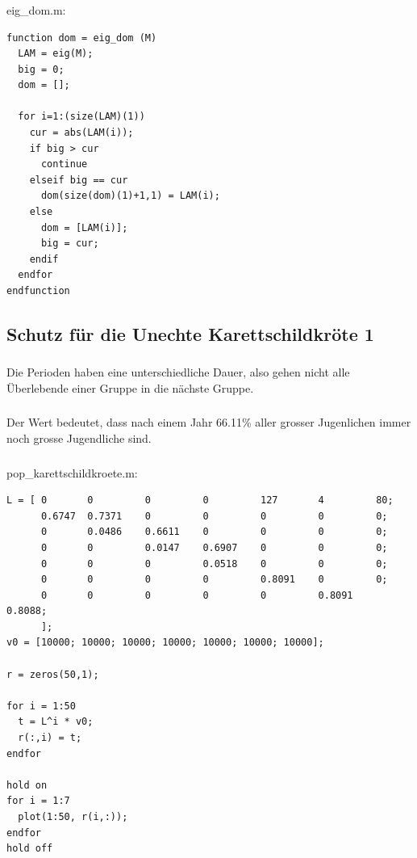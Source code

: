 \documentclass{article}
\begin{document}
\subsubsection{}

eig\_dom.m:
\begin{lstlisting}
function dom = eig_dom (M)
  LAM = eig(M);
  big = 0;
  dom = [];
  
  for i=1:(size(LAM)(1))
    cur = abs(LAM(i));
    if big > cur
      continue
    elseif big == cur
      dom(size(dom)(1)+1,1) = LAM(i);
    else
      dom = [LAM(i)];
      big = cur;
    endif
  endfor
endfunction
\end{lstlisting}

\subsection{Schutz für die Unechte Karettschildkröte 1}
\subsubsection{}
Die Perioden haben eine unterschiedliche Dauer, also gehen nicht alle Überlebende einer Gruppe in die nächste Gruppe.

\subsubsection{}
Der Wert bedeutet, dass nach einem Jahr 66.11\% aller grosser Jugenlichen immer noch grosse Jugendliche sind.

\subsubsection{}

pop\_karettschildkroete.m:


\begin{lstlisting}
L = [ 0       0         0         0         127       4         80;
      0.6747  0.7371    0         0         0         0         0;
      0       0.0486    0.6611    0         0         0         0;
      0       0         0.0147    0.6907    0         0         0;
      0       0         0         0.0518    0         0         0;
      0       0         0         0         0.8091    0         0;
      0       0         0         0         0         0.8091    0.8088;
      ];
v0 = [10000; 10000; 10000; 10000; 10000; 10000; 10000];

r = zeros(50,1);

for i = 1:50
  t = L^i * v0;
  r(:,i) = t;
endfor

hold on
for i = 1:7
  plot(1:50, r(i,:));
endfor
hold off
\end{lstlisting}
\end{document}
